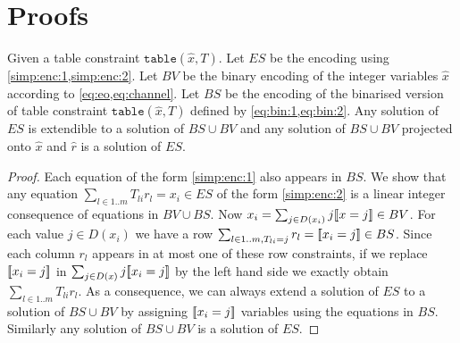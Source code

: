 \documentclass[a4paper,UKenglish,cleveref,autoref,thm-restate]{lipics-v2021}
\begin{document}


\appendix
\newpage

\section{Proofs}
\label{appendix:proofs}

\setcounter{theorem}{3}
\begin{theorem}
    Given a table constraint $\texttt{table}(\hat{x},T)$.
    Let $ES$ be the encoding using \cref{simp:enc:1,simp:enc:2}.
    Let $BV$ be the binary encoding of the integer variables $\hat{x}$ according to \cref{eq:eo,eq:channel}.
    Let $BS$ be the encoding of the binarised version of table constraint $\texttt{table}(\hat{x},T)$  defined
    by \cref{eq:bin:1,eq:bin:2}.
    Any solution of $ES$ is extendible to a solution of $BS \cup BV$ and any solution of $BS \cup BV$ projected onto $\hat{x}$ and $\hat{r}$ is a solution of $ES$.
\begin{proof}
    Each equation of the form \cref{simp:enc:1}
    also appears in $BS$.
    We show that any equation $\sum_{l \in 1..m} T_{li}r_l = x_i \in ES$ of the form 
    \cref{simp:enc:2} is a linear integer consequence of equations in $BV \cup BS$. 
    Now $x_i = \sum_{j \in D(x_i)} j [\![x = j]\!] \in BV$.
    For each value $j \in D(x_i)$ we have a row
    $\sum_{l \in 1..m, T_{li} = j} r_l = [\![x_i = j]\!] \in BS$. 
    Since each column $r_l$ appears in at most one of these 
    row constraints, if we replace $[\![x_i = j]\!]$ in $\sum_{j \in D(x)} j [\![x_i = j]\!]$ by the left hand side
    we exactly obtain $\sum_{l \in 1..m} T_{li}r_l$.
    As a consequence, we can always extend a solution of $ES$ to a solution of
    $BS \cup BV$ by assigning $[\![x_i = j]\!]$ variables using the equations in $BS$.
    Similarly any solution of $BS \cup BV$ is a solution of $ES$.
\end{proof}    
\end{theorem}
\end{document}
